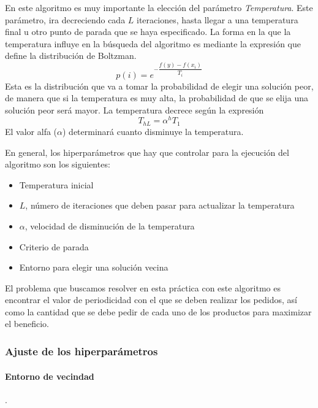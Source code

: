 \documentclass[a4paper,12pt]{article}
\begin{document}
	En este algoritmo es muy importante la elección del parámetro \textit{Temperatura}. Este parámetro, ira decreciendo cada $L$ iteraciones, hasta llegar a una temperatura final u otro punto de parada que se haya especificado. La forma en la que la temperatura influye en la búsqueda del algoritmo es mediante la expresión que define la distribución de Boltzman. 
	$$p(i)=e^{-\dfrac{f(y)-f(x_i)}{T_i}}$$
	Esta es la distribución que va a tomar la probabilidad de elegir una solución peor, de manera que si la temperatura es muy alta, la probabilidad de que se elija una solución peor será mayor. La temperatura decrece según la expresión
	$$T_{hL}=\alpha ^h T_1$$
	El valor alfa ($\alpha$) determinará cuanto disminuye la temperatura.
	
	En general, los hiperparámetros que hay que controlar para la ejecución del algoritmo son los siguientes:
	\begin{itemize}
		\item Temperatura inicial
		\item $L$, número de iteraciones que deben pasar para actualizar la temperatura
		\item $\alpha$, velocidad de disminución de la temperatura
		\item Criterio de parada
		\item Entorno para elegir una solución vecina
	\end{itemize}
	
	El problema que buscamos resolver en esta práctica con este algoritmo es encontrar el valor de periodicidad con el que se deben realizar los pedidos, así como la cantidad que se debe pedir de cada uno de los productos para maximizar el beneficio.
	
	\subsubsection{Ajuste de los hiperparámetros}

	\paragraph{Entorno de vecindad}.\\	
	
\end{document}
